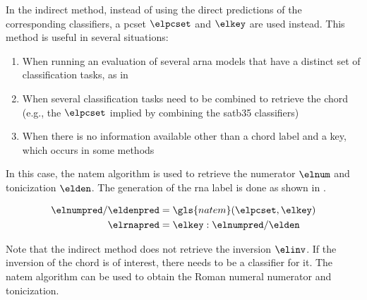 

In the indirect method, instead of using the direct
predictions of the corresponding classifiers, a \gls{pcset}
$\elpcset$ and $\elkey$ are used instead. This method is
useful in several situations: 
\begin{enumerate}
    \item When running an evaluation of several \gls{arna}
    models that have a distinct set of classification tasks,
    as in 
    \item When several classification tasks need to be
    combined to retrieve the chord (e.g., the $\elpcset$
    implied by combining the \gls{satb35} classifiers)
    \item When there is no information available other than
    a chord label and a key, which occurs in some methods
\end{enumerate}

In this case, the \gls{natem} algorithm is used to retrieve
the numerator $\elnum$ and tonicization $\elden$. The
generation of the \gls{rna} label is done as shown in
.

\begin{equation}
    \label{eq:rna_indirect}
    \begin{split}
        \elnumpred / \eldenpred &= \gls{natem}(\elpcset, \elkey) \\
        \elrnapred &= \elkey : \elnumpred / \elden 
    \end{split}
\end{equation}

Note that the indirect method does not retrieve the
inversion $\elinv$. If the inversion of the chord is of
interest, there needs to be a classifier for it. The
\gls{natem} algorithm can be used to obtain the Roman
numeral numerator and tonicization.




